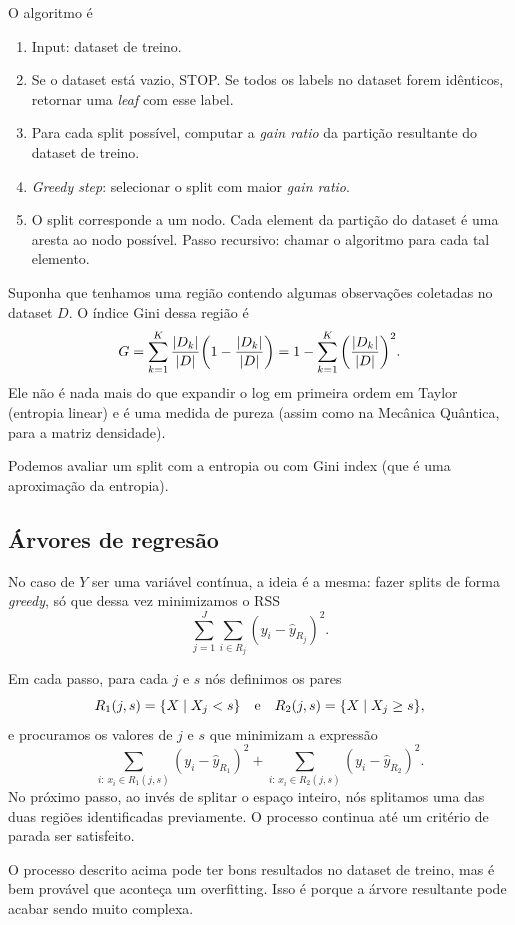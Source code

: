 \documentclass[a4paper,fleqn,12pt]{article}
\begin{document}
O algoritmo é
\begin{enumerate}
\item Input: dataset de treino.
\item Se o dataset está vazio, STOP. Se todos os labels no dataset forem idênticos, retornar uma \textit{leaf} com esse label.
\item Para cada split possível, computar a \textit{gain ratio} da partição resultante do dataset de treino.
\item \textit{Greedy step}: selecionar o split com maior \textit{gain ratio}.
\item O split corresponde a um nodo. Cada element da partição do dataset é uma aresta ao nodo possível. Passo recursivo: chamar o algoritmo para cada tal elemento.
\end{enumerate}

Suponha que tenhamos uma região contendo algumas observações coletadas no dataset $D$. O índice Gini dessa região é
$$
G = \sum_{k=1}^{K} \frac{\abs{D_k}}{\abs{D}} \qty(1 - \frac{\abs{D_k}}{\abs{D}}) = 1 - \sum_{k=1}^{K} \qty(\frac{\abs{D_k}}{\abs{D}})^2.
$$
Ele não é nada mais do que expandir o log em primeira ordem em Taylor (entropia linear) e é uma medida de pureza (assim como na Mecânica Quântica, para a matriz densidade).

Podemos avaliar um split com a entropia ou com Gini index (que é uma aproximação da entropia).

\subsection{Árvores de regresão}

No caso de $Y$ ser uma variável contínua, a ideia é a mesma: fazer splits de forma \textit{greedy}, só que dessa vez minimizamos o RSS
$$
\sum_{j=1}^{J} \sum_{i \in R_j} (y_i - \hat{y}_{R_j})^2.
$$

Em cada passo, para cada $j$ e $s$ nós definimos os pares
$$
R_1(j, s) = \qty{X \mid X_j < s} \quad \mathrm{e} \quad R_2(j, s) = \qty{X \mid X_j \geq s},
$$
e procuramos os valores de $j$ e $s$ que minimizam a expressão
$$
\sum_{i : \, x_i \in R_1(j, s)} (y_i - \hat{y}_{R_1})^2 +
\sum_{i : \, x_i \in R_2(j, s)} (y_i - \hat{y}_{R_2})^2.
$$
No próximo passo, ao invés de splitar o espaço inteiro, nós splitamos uma das duas regiões identificadas previamente. O processo continua até um critério de parada ser satisfeito.

O processo descrito acima pode ter bons resultados no dataset de treino, mas é bem provável que aconteça um overfitting. Isso é porque a árvore resultante pode acabar sendo muito complexa.
\end{document}
